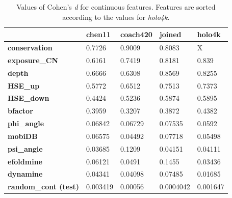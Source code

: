 \begin{table}[]\centering
\begin{tabular}{@{}lllll@{}}
\toprule
                      & \textbf{chen11} & \textbf{coach420} & \textbf{joined} & \textbf{holo4k} \\ \midrule
\textbf{conservation} & 0.7726          & 0.9009            & 0.8083          & X               \\
\textbf{exposure\_CN} & 0.6161          & 0.7419            & 0.8181          & 0.839           \\
\textbf{depth}        & 0.6666          & 0.6308            & 0.8569          & 0.8255          \\
\textbf{HSE\_up}      & 0.5772          & 0.6512            & 0.7513          & 0.7373          \\
\textbf{HSE\_down}    & 0.4424          & 0.5236            & 0.5874          & 0.5895          \\
\textbf{bfactor}      & 0.3959          & 0.3207            & 0.3872          & 0.4382          \\
\textbf{phi\_angle}   & 0.06842         & 0.06729           & 0.07535         & 0.0592          \\
\textbf{mobiDB}       & 0.06575         & 0.04492           & 0.07718         & 0.05498         \\
\textbf{psi\_angle}   & 0.03685         & 0.1209            & 0.04151         & 0.04111         \\
\textbf{efoldmine}    & 0.06121         & 0.0491            & 0.1455          & 0.03436         \\
\textbf{dynamine}     & 0.04341         & 0.04098           & 0.07485         & 0.01685         \\
\textbf{random\_cont (test)} & 0.003419        & 0.00056           & 0.0004042       & 0.001647        \\ \bottomrule
\end{tabular}
\caption[Values of Cohen's \textit{d}]{Values of Cohen's \textit{d} for continuous features. Features are sorted according to the values for \textit{holo4k}.}
\label{tab:cohensd}
\end{table}

